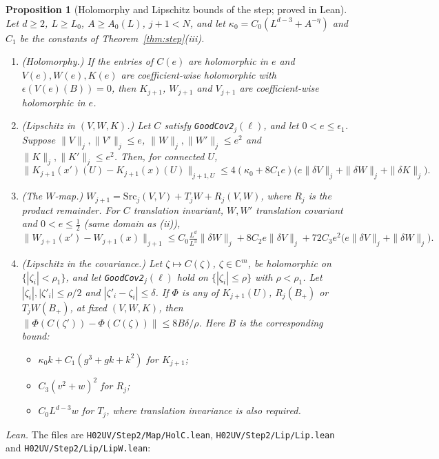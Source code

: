 \documentclass[11pt]{amsart}
\newtheorem{proposition}[theorem]{Proposition}
\theoremstyle{definition}
\theoremstyle{remark}
\numberwithin{equation}{section}
\newcommand{\C}{\mathbb{C}}
\begin{document}
\begin{proposition}[Holomorphy and Lipschitz bounds of the step; proved in Lean]\label{prop:step-lip}
Let $d\ge2$, $L\ge L_0$, $A\ge A_0(L)$, $j+1<N$, and let $\kappa_0=C_0(L^{d-3}+A^{-\eta})$ and $C_1$ be the
constants of Theorem~\ref{thm:step}(iii).
\begin{enumerate}
\item[(i)] (Holomorphy.) If the entries of $C(e)$ are holomorphic in $e$ and $V(e),W(e),K(e)$ are
  coefficient-wise holomorphic with $\epsilon(V(e)(B))=0$, then $K_{j+1}$, $W_{j+1}$ and $V_{j+1}$ are
  coefficient-wise holomorphic in $e$.
\item[(ii)] (Lipschitz in $(V,W,K)$.) Let $C$ satisfy \texttt{GoodCov2}$_j(\ell)$, and let
  $0<e\le\epsilon_1$. Suppose $\|V\|_j,\|V'\|_j\le e$, $\|W\|_j,\|W'\|_j\le e^2$ and
  $\|K\|_j,\|K'\|_j\le e^2$. Then, for connected $U$,
  \[
    \|K_{j+1}(x')(U)-K_{j+1}(x)(U)\|_{j+1,U}\le4(\kappa_0+8C_1e)\bigl(e\|\delta V\|_j+\|\delta W\|_j
      +\|\delta K\|_j\bigr).
  \]
\item[(iii)] (The $W$-map.) $W_{j+1}=\mathrm{Src}_j(V,V)+T_jW+R_j(V,W)$, where $R_j$ is the
  product remainder. For $C$ translation invariant, $W,W'$ translation covariant and
  $0<e\le\frac12$ (same domain as (ii)),
  \[
    \|W_{j+1}(x')-W_{j+1}(x)\|_{j+1}\le C_0\tfrac{L^d}{L^3}\|\delta W\|_j+8C_2e\|\delta V\|_j
      +72C_3e^2\bigl(e\|\delta V\|_j+\|\delta W\|_j\bigr).
  \]
\item[(iv)] (Lipschitz in the covariance.) Let $\zeta\mapsto C(\zeta)$, $\zeta\in\C^m$, be holomorphic
  on $\{|\zeta_i|<\rho_1\}$, and let \texttt{GoodCov2}$_j(\ell)$ hold on $\{|\zeta_i|\le\rho\}$ with
  $\rho<\rho_1$. Let $|\zeta_i|,|\zeta'_i|\le\rho/2$ and $|\zeta'_i-\zeta_i|\le\delta$. If $\Phi$ is any of
  $K_{j+1}(U)$, $R_j(B_+)$ or $T_jW(B_+)$, at fixed $(V,W,K)$, then
  $\|\Phi(C(\zeta'))-\Phi(C(\zeta))\|\le8B\delta/\rho$. Here $B$ is the corresponding bound:
  \begin{itemize}
  \item $\kappa_0k+C_1(g^3+gk+k^2)$ for $K_{j+1}$;
  \item $C_3(v^2+w)^2$ for $R_j$;
  \item $C_0L^{d-3}w$ for $T_j$, where translation invariance is also required.
  \end{itemize}
\end{enumerate}
\end{proposition}
\noindent\emph{Lean.} The files are \texttt{H02UV/Step2/Map/HolC.lean}, \texttt{H02UV/Step2/Lip/Lip.lean} and \texttt{H02UV/Step2/Lip/LipW.lean}:
\end{document}
